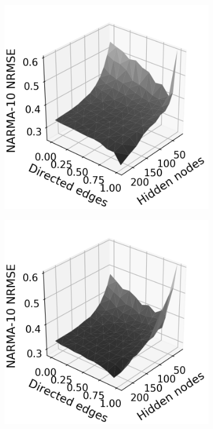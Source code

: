 \begin{figure}[htb]
  \centering
  \begin{subfigure}{.32\textwidth}
    \centering
    \includegraphics[width=1.0\linewidth]{figures/rt-dir-perf-sq.png}
    \caption{}
    \label{fig:rt-dir-perf-trisurf-sq}
  \end{subfigure}
  \begin{subfigure}{.32\textwidth}
    \centering
    \includegraphics[width=1.0\linewidth]{figures/rt-dir-perf-hex.png}

\end{subfigure}
\end{figure}
